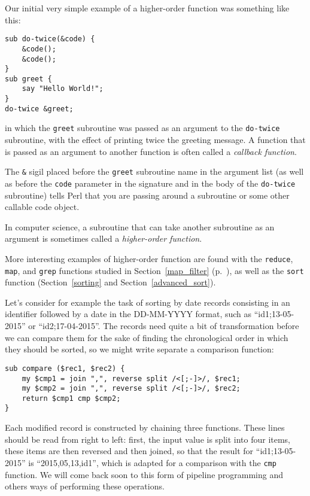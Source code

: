Our initial very simple example of a higher-order function 
was something like this:

\begin{verbatim}
sub do-twice(&code) {
    &code(); 
    &code();
}
sub greet {
    say "Hello World!";
}
do-twice &greet;
\end{verbatim}

in which the {\tt greet} subroutine was passed as an 
argument to the {\tt do-twice} subroutine, with the 
effect of printing twice the greeting message. A 
function that is passed as an argument to another function 
is often called a \emph{callback function}.

The \verb"&" sigil placed before the {\tt greet} 
subroutine name in the argument list (as well as before 
the {\tt code} parameter in the signature and in the 
body of the {\tt do-twice} subroutine) tells Perl 
that you are passing around a subroutine or some 
other callable code object.
\ifplastex \else
{}
\fi

In computer science, a subroutine that can take 
another subroutine as an argument is sometimes 
called a \emph{higher-order function}.

More interesting examples of higher-order function 
are found with the {\tt reduce}, {\tt map}, and
{\tt grep} functions studied in Section~\ref{map_filter} 
(p.~\pageref{map_filter}), as well as the {\tt sort} 
function (Section~\ref{sorting} and Section~\ref{advanced_sort}).

Let's consider for example the task of sorting by date 
records consisting in an identifier followed by a date 
in the DD-MM-YYYY format, such as ``id1;13-05-2015'' 
or ``id2;17-04-2015''. The records need quite a bit of 
transformation before we can compare them for the sake 
of finding the chronological order in which they should 
be sorted, so we might write separate a comparison 
function:

\begin{verbatim}
sub compare ($rec1, $rec2) {
    my $cmp1 = join ",", reverse split /<[;-]>/, $rec1;
    my $cmp2 = join ",", reverse split /<[;-]>/, $rec2;
    return $cmp1 cmp $cmp2;
}   
\end{verbatim}

Each modified record is constructed by chaining three 
functions. These lines should be read from right to left: 
first, the input value is split into four items, these 
items are then reversed and then joined, so that the result 
for ``id1;13-05-2015'' is ``2015,05,13,id1'', which is 
adapted for a comparison with the {\tt cmp} function. We 
will come back soon to this form of pipeline programming 
and others ways of performing these operations. 

